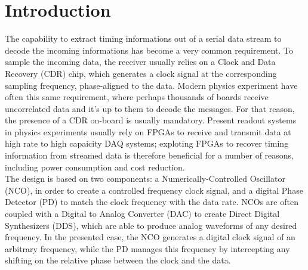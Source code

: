 \documentclass[11pt]{article}
\renewcommand{\>}{\rangle} \renewcommand{\emptyset}{\varnothing}
\begin{document}
\section{Introduction}
The capability to extract timing informations out of a serial data stream to
decode the incoming informations has become a very common requirement. To sample
the incoming data, the receiver usually relies on a Clock and Data Recovery
(CDR) chip, which generates a clock signal at the corresponding sampling
frequency, phase-aligned to the data. Modern physics experiment have often this
same requirement, where perhaps thousands of boards receive uncorrelated data
and it's up to them to decode the messages. For that reason, the presence of a
CDR on-board is usually mandatory. Present readout systems in physics
experiments usually rely on FPGAs to receive and transmit data at high rate to
high capaicity DAQ systems; exploting FPGAs to recover timing information from
streamed data is therefore beneficial for a number of reasons, including power
consumption and cost reduction. \\
The design is based on two components: a Numerically-Controlled Oscillator
(NCO), in order to create a controlled frequency clock signal, and a digital
Phase Detector (PD) to match the clock frequency with the data rate. NCOs are
often coupled with a Digital to Analog Converter (DAC) to create Direct Digital
Synthesizers (DDS), which are able to produce analog waveforms of any desired
frequency. In the presented case, the NCO generates a digital clock signal of an
arbitrary frequency, while the PD manages this frequency by intercepting any
shifting on the relative phase between the clock and the data.
\end{document}
